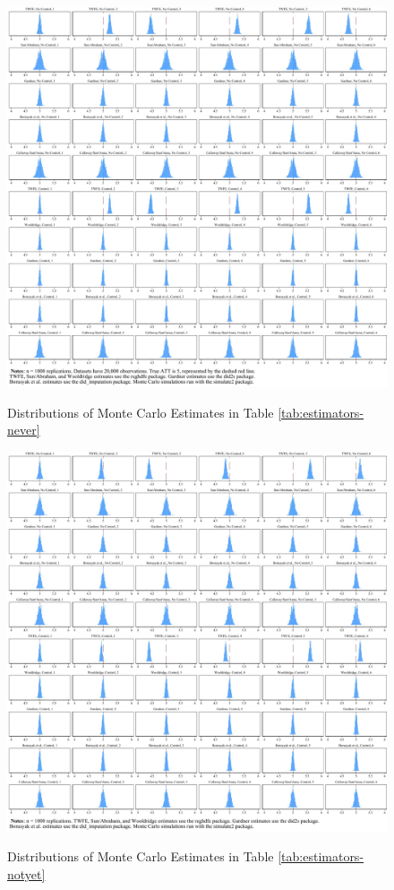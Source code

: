 \documentclass[12pt]{article}
\begin{document}
\begin{figure}[H]
    \centering
    \caption{Distributions of Monte Carlo Estimates in Table \ref{tab:estimators-never}}
    \includegraphics[width=6in]{Figures/Histograms of Monte Carlo Estimates 1.jpg}
    \label{fig:hist1}
\end{figure}

\begin{figure}[H]
    \centering
    \caption{Distributions of Monte Carlo Estimates in Table \ref{tab:estimators-notyet}}
    \includegraphics[width=6in]{Figures/Histograms of Monte Carlo Estimates 2.jpg}
    \label{fig:hist2}
\end{figure}
\end{document}
